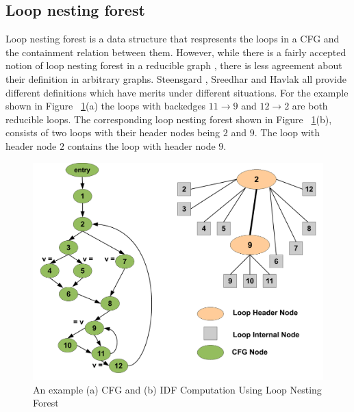    \subsection{Loop nesting forest}
     Loop nesting forest is a data structure that respresents the loops in a CFG
    and the containment relation between them. However, while there is a fairly accepted notion of
    loop nesting forest in a reducible graph \cite{morgan_book}, there is less agreement about their
    definition in arbitrary graphs. Steensgard \cite{steensgard}, Sreedhar \cite{sreedhar} and Havlak
    \cite{havlak} all provide different definitions which have merits under different situations. 
    For the example shown in Figure ~\ref{fig:lnf}(a) the loops with backedges $11 \rightarrow 9$ and
    $12 \rightarrow 2$ are both reducible loops. The corresponding loop nesting forest shown in Figure ~\ref{fig:lnf}(b), consists of two loops
    with their header nodes being $2$ and $9$. 
    The loop with header node $2$ contains the loop with header node $9$.

    \begin{figure}[htb]
    \centerline{\includegraphics[scale=0.25]{lnfred.pdf}}
    \caption{An example (a) CFG and (b) IDF Computation Using Loop Nesting Forest }
    \label{fig:lnf}
    \end{figure} 


